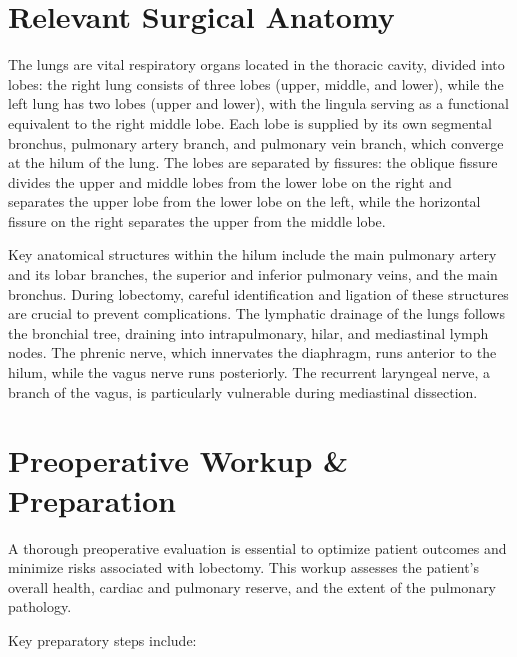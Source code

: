\section*{Relevant Surgical Anatomy}
The lungs are vital respiratory organs located in the thoracic cavity, divided into lobes: the right lung consists of three lobes (upper, middle, and lower), while the left lung has two lobes (upper and lower), with the lingula serving as a functional equivalent to the right middle lobe. Each lobe is supplied by its own segmental bronchus, pulmonary artery branch, and pulmonary vein branch, which converge at the hilum of the lung. The lobes are separated by fissures: the oblique fissure divides the upper and middle lobes from the lower lobe on the right and separates the upper lobe from the lower lobe on the left, while the horizontal fissure on the right separates the upper from the middle lobe.

Key anatomical structures within the hilum include the main pulmonary artery and its lobar branches, the superior and inferior pulmonary veins, and the main bronchus. During lobectomy, careful identification and ligation of these structures are crucial to prevent complications. The lymphatic drainage of the lungs follows the bronchial tree, draining into intrapulmonary, hilar, and mediastinal lymph nodes. The phrenic nerve, which innervates the diaphragm, runs anterior to the hilum, while the vagus nerve runs posteriorly. The recurrent laryngeal nerve, a branch of the vagus, is particularly vulnerable during mediastinal dissection.

\section*{Preoperative Workup \& Preparation}
A thorough preoperative evaluation is essential to optimize patient outcomes and minimize risks associated with lobectomy. This workup assesses the patient's overall health, cardiac and pulmonary reserve, and the extent of the pulmonary pathology.

Key preparatory steps include:


